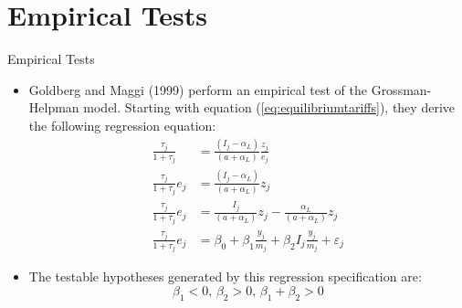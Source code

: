 \documentclass[aspectratio=169]{beamer}
\begin{document}

\section{Empirical Tests}


\begin{frame}{Empirical Tests}

\begin{itemize}
    \item<1-> Goldberg and Maggi (1999) perform an empirical test of the Grossman-Helpman model.  Starting with equation (\ref{eq:equilibriumtariffs}), they derive the following regression equation:
    \begin{align*}
       \frac{\tau_{j}}{1 + \tau_{j}} &= \frac{\left( I_{j} - \alpha_{L} \right)}{\left( a + \alpha_{L} \right)} \frac{z_{j}}{e_{j}} \\
       \frac{\tau_{j}}{1 + \tau_{j}} e_{j} &= \frac{\left( I_{j} - \alpha_{L} \right)}{\left( a + \alpha_{L} \right)} z_{j} \\
       \frac{\tau_{j}}{1 + \tau_{j}} e_{j} &= \frac{I_{j}}{\left( a + \alpha_{L} \right)} z_{j} - \frac{\alpha_{L}}{\left( a + \alpha_{L} \right)} z_{j} \\
       \frac{\tau_{j}}{1 + \tau_{j}} e_{j} &= \beta_{0} + \beta_{1} \frac{y_{j}}{m_{j}} + \beta_{2} I_{j} \frac{y_{j}}{m_{j}} + \varepsilon_{j}
    \end{align*}
    \item<2-> The testable hypotheses generated by this regression specification are:
    \begin{equation*}
        \beta_{1} < 0 \text{,  } \beta_{2} > 0 \text{,  } \beta_{1} + \beta_{2} > 0
    \end{equation*}
\end{itemize}

    
\end{frame}

\end{document}
